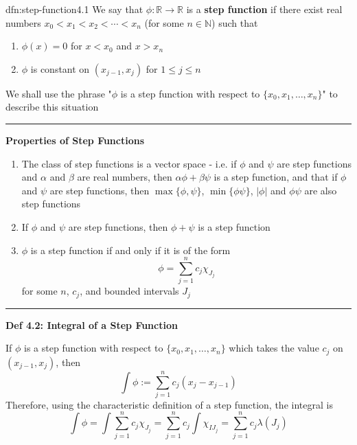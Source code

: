 \documentclass[landscape, 8pt]{extarticle}
\begin{document}
\begin{multicols}{3}
\begin{dfn}{dfn:step-function}{4.1}
	We say that $\phi:\mathbb{R}\to \mathbb{R}$ is a \textbf{step function} if there exist real numbers $x_{0}<x_{1}<x_{2}<\cdots<x_{n}$ (for some $n\in \mathbb{N}$) such that

	\begin{enumerate}
	    \setlength\itemsep{0em}
	    \item $\phi(x)=0$ for $x<x_{0}$ and $x>x_{n}$
	    \item $\phi$ is constant on $(x_{j-1}, x_{j})$ for $1\le j \le n$
	\end{enumerate}

	We shall use the phrase "$\phi$ is a step function with respect to $\{x_{0},x_{1},\dots,x_{n}\}$" to describe this situation


	\noindent\rule{\textwidth}{0.2pt}

	\textbf{Properties of Step Functions}

	\vspace{-5pt}
	\begin{enumerate}
	    \setlength\itemsep{0em}
	    \item The class of step functions is a vector space - i.e. if $\phi$ and $\psi$ are step functions and $\alpha$ and $\beta$ are real numbers, then $\alpha\phi+\beta\psi$ is a step function, and that if $\phi$ and $\psi$ are step functions, then $\max\{\phi,\psi\}$, $\min\{\phi\psi\}$, $\lvert \phi \rvert$ and $\phi\psi$ are also step functions
	    \item If $\phi$ and $\psi$ are step functions, then $\phi + \psi$ is a step function
	    \item $\phi$ is a step function if and only if it is of the form
	\[\phi=\sum_{j=1}^{n} c_{j}\chi_{J_{j}}\]
	for some $n$, $c_{j}$, and bounded intervals $J_{j}$
	\end{enumerate}

	\vspace{-8pt}
	\noindent\rule{\textwidth}{0.2pt}

	\textbf{Def 4.2: Integral of a Step Function}

	If $\phi$ is a step function with respect to $\{x_{0},x_{1},\dots,x_{n}\}$ which takes the value $c_{j}$ on $(x_{j-1},x_{j})$, then
	\[\int \phi := \sum_{j=1}^{n} c_{j}(x_{j}-x_{j-1})\]
	Therefore, using the characteristic definition of a step function, the integral is
	\[\int \phi = \int \sum_{j=1}^{n} c_{j}\chi_{J_{j}}=\sum_{j=1}^{n} c_{j}\int \chi_{IJ_{j}}=\sum_{j=1}^{n} c_{j}\lambda(J_{j})\]
\end{dfn}


\end{multicols}
\end{document}

